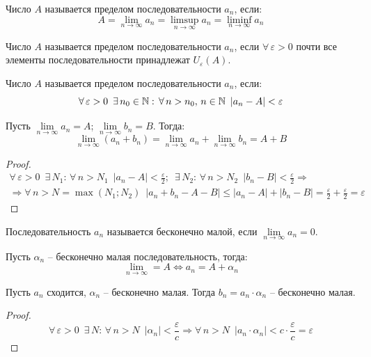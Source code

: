 \documentclass[12pt]{article}
\begin{document}
\begin{definition}
    Число $A$ называется пределом последовательности $a_n$, если:
    $$A=\lim_{n\to\infty}a_n=\limsup\limits_{n\to\infty}a_n=\liminf\limits_{n\to\infty}a_n$$
\end{definition}
\begin{definition}
    Число $A$ называется пределом последовательности $a_n$, если $\forall\,\varepsilon>0$ почти все элементы последовательности принадлежат $U_\varepsilon(A)$.
\end{definition}
\begin{definition}
    Число $A$ называется пределом последовательности $a_n$, если:
    $$\forall\,\varepsilon>0\enspace\exists\,n_0\in\mathbb{N}:\,\forall\,n>n_0,\,n\in\mathbb{N}\enspace |a_n-A|<\varepsilon$$
\end{definition}
\begin{theorem}
    Пусть $\lim\limits_{n\to\infty}a_n=A$; $\lim\limits_{n\to\infty}b_n=B$. Тогда:
    $$\lim\limits_{n\to\infty}(a_n+b_n)=\lim\limits_{n\to\infty}a_n+\lim\limits_{n\to\infty}b_n=A+B$$
\end{theorem}
\begin{proof}
    \begin{multline*}
        \forall\,\varepsilon>0\enspace\exists\,N_1:\,\forall\,n>N_1\enspace |a_n-A|<\frac{\varepsilon}{2};\enspace \exists\,N_2:\,\forall\,n>N_2\enspace |b_n-B|<\frac{\varepsilon}{2}\Longrightarrow\\
        \Longrightarrow\forall\,n>N=\max(N_1;N_2)\enspace |a_n+b_n-A-B|\leq |a_n-A|+|b_n-B|=\frac{\varepsilon}{2}+\frac{\varepsilon}{2}=\varepsilon
    \end{multline*}
\end{proof}
\begin{definition}
    Последовательность $a_n$ называется бесконечно малой, если $\lim\limits_{n\to\infty}a_n=0$.
\end{definition}
\begin{theorem}
    Пусть $\alpha_n$ -- бесконечно малая последовательность, тогда:
    $$\lim_{n\to\infty}=A\Longleftrightarrow a_n=A+\alpha_n$$
\end{theorem}
\begin{theorem}
    Пусть $a_n$ сходится, $\alpha_n$ -- бесконечно малая. Тогда $b_n=a_n\cdot\alpha_n$ -- бесконечно малая.
\end{theorem}
\begin{proof}
    $$\forall\,\varepsilon>0\enspace \exists\,N:\,\forall\,n>N\enspace |\alpha_n|<\frac{\varepsilon}{c}\Longrightarrow\forall\,n>N\enspace |a_n\cdot\alpha_n|<c\cdot\frac{\varepsilon}{c}=\varepsilon$$
\end{proof}
\end{document}
